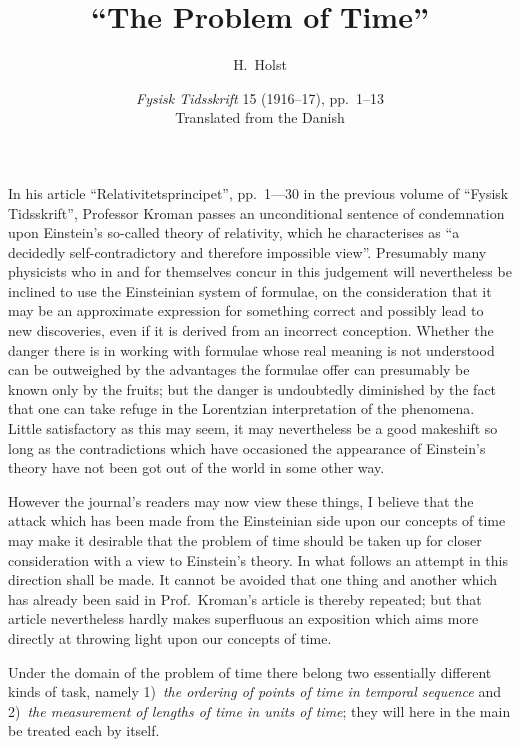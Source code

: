 \documentclass[12pt,a4paper]{article}
\title{\textbf{``The Problem of Time''}}
\author{H.\ Holst}
\date{\textit{Fysisk Tidsskrift} 15 (1916--17), pp.~1--13\\[2pt]
\small Translated from the Danish}
\begin{document}
\maketitle

In his article ``Relativitetsprincipet'', pp.~1---30 in the previous volume of
``Fysisk Tidsskrift'', Professor Kroman passes an unconditional sentence of
condemnation upon Einstein's so-called theory of relativity, which he
characterises as ``a decidedly self-contradictory and therefore impossible
view''. Presumably many physicists who in and for themselves concur in this
judgement will nevertheless be inclined to use the Einsteinian system of
formulae, on the consideration that it may be an approximate expression for
something correct and possibly lead to new discoveries, even if it is derived
from an incorrect conception. Whether the danger there is in working with
formulae whose real meaning is not understood can be outweighed by the
advantages the formulae offer can presumably be known only by the fruits; but
the danger is undoubtedly diminished by the fact that one can take refuge in
the Lorentzian interpretation of the phenomena. Little satisfactory as this
may seem, it may nevertheless be a good makeshift so long as the
contradictions which have occasioned the appearance of Einstein's theory have
not been got out of the world in some other way.

However the journal's readers may now view these things, I believe that the
attack which has been made from the Einsteinian side upon our concepts of time
may make it desirable that the problem of time should be taken up for closer
consideration with a view to Einstein's theory. In what follows an attempt in
this direction shall be made. It cannot be avoided that one thing and another
which has already been said in Prof.\ Kroman's article is thereby repeated;
but that article nevertheless hardly makes superfluous an exposition which
aims more directly at throwing light upon our concepts of time.

Under the domain of the problem of time there belong two essentially different
kinds of task, namely 1)~\emph{the ordering of points of time in temporal
sequence} and 2)~\emph{the measurement of lengths of time in units of time};
they will here in the main be treated each by itself.
\end{document}

